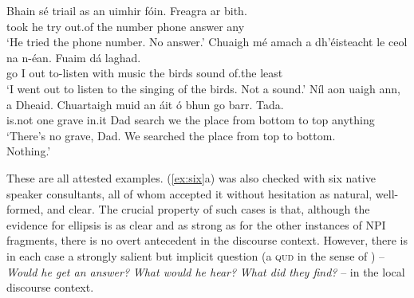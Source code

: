 \documentclass[output=paper,colorlinks,citecolor=brown]{langscibook}
\begin{document}
\ea\label{ex:six}
\ea
\gll Bhain sé triail as an uimhir fóin. Freagra {ar bith}. \\
    {took\past} he try out.of the number {phone\gen} answer any \\
\glt `He tried the phone number. No answer.'
\ex
\gll Chuaigh mé amach {a dh'éisteacht} le ceol na n-éan. Fuaim dá laghad. \\
     {go\past} I out  {to-listen} with music {the\gen} {birds\gen} sound {of.the} least \\
\glt `I went out to listen to the singing of the birds. Not a sound.' 
\ex
\gll Níl aon uaigh ann, a Dheaid. Chuartaigh muid an áit ó bhun go barr. Tada. \\
     {is.not} one grave in.it {\voca} Dad {search\past} we the place from bottom to top anything \\
\glt `There's no grave, Dad. We searched the place from top to bottom.\\ Nothing.'
\z
\z


These are all attested examples. (\ref{ex:six}a) was also checked with six native speaker consultants, all of whom accepted it without hesitation as natural, well-formed, and clear. The crucial property of such cases is that, although the evidence for ellipsis is as clear and as strong as for the other instances of NPI fragments, there is no overt antecedent in the discourse context. However, there is in each case a strongly salient but implicit question (a {\scshape qud} in the sense of \cite{roberts:12}) -- {\itshape Would he get an answer?} {\itshape What would he hear?} {\itshape What did they find?} -- in the local discourse context.
\end{document}
